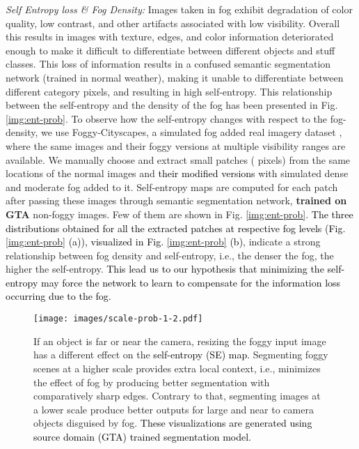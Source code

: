 \documentclass[final,5p,times,twocolumn]{elsarticle}
\begin{document}
\textit{Self Entropy loss \& Fog Density:} Images taken in fog exhibit degradation of color quality, low contrast, and other artifacts associated with low visibility. 
Overall this results in images with texture, edges, and color information deteriorated enough to make it difficult to differentiate between different objects and stuff classes. 
This loss of information results in a confused semantic segmentation network (trained in normal weather), making it unable to differentiate between different category pixels, and resulting in high self-entropy. 
This relationship between the self-entropy and the density of the fog has been presented in Fig. \ref{img:ent-prob}. 
To observe how the self-entropy changes with respect to the fog-density, we use Foggy-Cityscapes, a simulated fog added real imagery dataset \cite{sakaridis2018semantic}, where the same images and their foggy versions at multiple visibility ranges are available.
We manually choose and extract small patches ( pixels) from the same locations  of the normal images and \textcolor{black}{their modified versions} with simulated dense and moderate fog added to it.  
Self-entropy maps are computed for each patch after passing these images through semantic segmentation network, \textbf{trained on GTA} non-foggy images. Few of them are shown in Fig. \ref{img:ent-prob}.
\textcolor{black}{The three distributions obtained for all the extracted patches at respective fog levels (Fig. \ref{img:ent-prob} (a)), visualized in Fig. \ref{img:ent-prob} (b)}, indicate a strong relationship between fog density and self-entropy, i.e., the denser the fog, the higher the self-entropy. 
\textcolor{black}{This lead us to our hypothesis that minimizing the self-entropy may force the network to learn to compensate for the information loss occurring due to the fog.}



\begin{figure*}[htb]
\centering
\texttt{[image: images/scale-prob-1-2.pdf]}
 	\scriptsize
 	\caption{If an object is far or near the camera, resizing the foggy input image has a different effect on the \textcolor{black}{ self-entropy (SE) map.} 
Segmenting foggy scenes at a higher scale provides extra local context, i.e., minimizes the effect of fog by producing better segmentation with comparatively sharp edges. Contrary to that, segmenting images at a lower scale produce better outputs for large and near to camera objects disguised by fog.  \textcolor{black}{These visualizations are generated using source domain (GTA) trained segmentation model.}}

 	\label{img:scale-prob}
\end{figure*}
\end{document}
